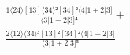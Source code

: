 \documentclass[varwidth, border=5pt]{standalone}
\begin{document}
\begin{my}
$\begin{gathered}
\scriptscriptstyle\frac{1⟨24⟩[13]⟨34⟩²[34]²⟨4|1+2|3]}{⟨3|1+2|3]⁴} +\\
\scriptscriptstyle\frac{2⟨12⟩⟨34⟩³[13]²[34]²⟨4|1+2|3]}{⟨3|1+2|3]⁵} \phantom{+}
\end{gathered}$
\end{my}
\end{document}
